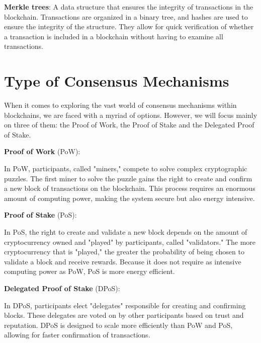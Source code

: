 \begin{remark}
\textbf{Merkle trees}:
A data structure that ensures the integrity of transactions in the blockchain.
Transactions are organized in a binary tree, and hashes are used to ensure the integrity of the structure.
They allow for quick verification of whether a transaction is included in a blockchain without having to examine all transactions.
\end{remark}


\section{Type of Consensus Mechanisms}
When it comes to exploring the vast world of consensus mechanisms within blockchains, we are faced with a myriad of options. However, we will focus mainly on three of them: the Proof of Work, the Proof of Stake and the Delegated Proof of Stake. 

\faBitcoin \; \textbf{Proof of Work} (PoW):

In PoW, participants, called "miners," compete to solve complex cryptographic puzzles.
The first miner to solve the puzzle gains the right to create and confirm a new block of transactions on the blockchain.
This process requires an enormous amount of computing power, making the system secure but also energy intensive.

\faEthereum \; \textbf{Proof of Stake} (PoS):

In PoS, the right to create and validate a new block depends on the amount of cryptocurrency owned and "played" by participants, called "validators."
The more cryptocurrency that is "played," the greater the probability of being chosen to validate a block and receive rewards.
Because it does not require as intensive computing power as PoW, PoS is more energy efficient.

\faUsers \; \textbf{Delegated Proof of Stake} (DPoS):

In DPoS, participants elect "delegates" responsible for creating and confirming blocks.
These delegates are voted on by other participants based on trust and reputation.
DPoS is designed to scale more efficiently than PoW and PoS, allowing for faster confirmation of transactions.

